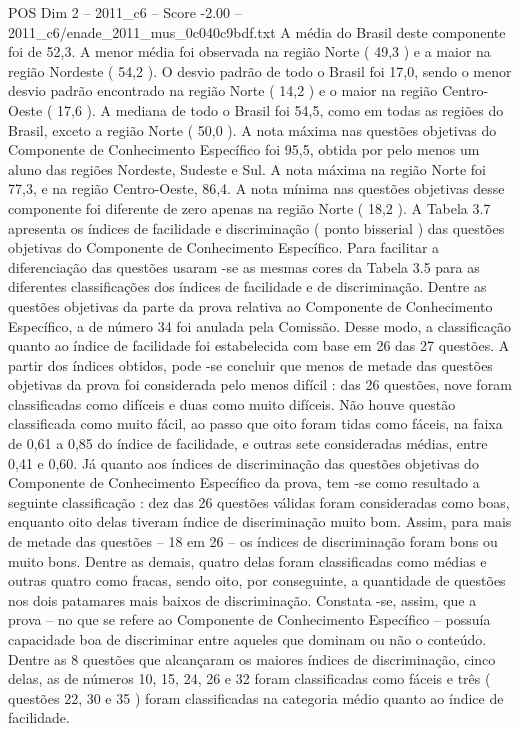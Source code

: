 \begin{textsample}{POS Dim 2 – 2011\_c6 – Score -2.00 – 2011\_c6/enade\_2011\_mus\_0c040c9bdf.txt}
A média do Brasil deste componente foi de 52,3.
A menor média foi observada na região Norte ( 49,3 ) e a maior na região Nordeste ( 54,2 ).
O desvio padrão de todo o Brasil foi 17,0, sendo o menor desvio padrão encontrado na região Norte ( 14,2 ) e o maior na região Centro-Oeste ( 17,6 ).
A mediana de todo o Brasil foi 54,5, como em todas as regiões do Brasil, exceto a região Norte ( 50,0 ).
A nota máxima nas questões objetivas do Componente de Conhecimento Específico foi 95,5, obtida por pelo menos um aluno das regiões Nordeste, Sudeste e Sul.
A nota máxima na região Norte foi 77,3, e na região Centro-Oeste, 86,4.
A nota mínima nas questões objetivas desse componente foi diferente de zero apenas na região Norte ( 18,2 ).
A Tabela 3.7 apresenta os índices de facilidade e discriminação ( ponto bisserial ) das questões objetivas do Componente de Conhecimento Específico.
Para facilitar a diferenciação das questões usaram -se as mesmas cores da Tabela 3.5 para as diferentes classificações dos índices de facilidade e de discriminação.
Dentre as questões objetivas da parte da prova relativa ao Componente de Conhecimento Específico, a de número 34 foi anulada pela Comissão.
Desse modo, a classificação quanto ao índice de facilidade foi estabelecida com base em 26 das 27 questões.
A partir dos índices obtidos, pode -se concluir que menos de metade das questões objetivas da prova foi considerada pelo menos difícil : das 26 questões, nove foram classificadas como difíceis e duas como muito difíceis.
Não houve questão classificada como muito fácil, ao passo que oito foram tidas como fáceis, na faixa de 0,61 a 0,85 do índice de facilidade, e outras sete consideradas médias, entre 0,41 e 0,60.
Já quanto aos índices de discriminação das questões objetivas do Componente de Conhecimento Específico da prova, tem -se como resultado a seguinte classificação : dez das 26 questões válidas foram consideradas como boas, enquanto oito delas tiveram índice de discriminação muito bom.
Assim, para mais de metade das questões – 18 em 26 – os índices de discriminação foram bons ou muito bons.
Dentre as demais, quatro delas foram classificadas como médias e outras quatro como fracas, sendo oito, por conseguinte, a quantidade de questões nos dois patamares mais baixos de discriminação.
Constata -se, assim, que a prova – no que se refere ao Componente de Conhecimento Específico – possuía capacidade boa de discriminar entre aqueles que dominam ou não o conteúdo.
Dentre as 8 questões que alcançaram os maiores índices de discriminação, cinco delas, as de números 10, 15, 24, 26 e 32 foram classificadas como fáceis e três ( questões 22, 30 e 35 ) foram classificadas na categoria médio quanto ao índice de facilidade.

\end{textsample}
